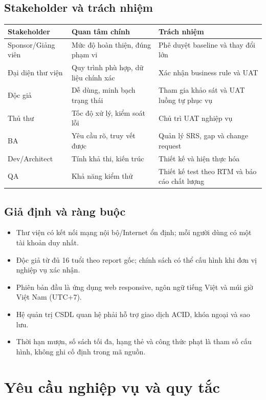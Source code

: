 \documentclass[12pt,a4paper,oneside]{report}
\begin{document}
\section{Stakeholder và trách nhiệm}
\begin{tabularx}{\textwidth}{L{3cm}L{4cm}Y}
\toprule Stakeholder & Quan tâm chính & Trách nhiệm\\\midrule
Sponsor/Giảng viên & Mức độ hoàn thiện, đúng phạm vi & Phê duyệt baseline và thay đổi lớn\\
Đại diện thư viện & Quy trình phù hợp, dữ liệu chính xác & Xác nhận business rule và UAT\\
Độc giả & Dễ dùng, minh bạch trạng thái & Tham gia khảo sát và UAT luồng tự phục vụ\\
Thủ thư & Tốc độ xử lý, kiểm soát lỗi & Chủ trì UAT nghiệp vụ\\
BA & Yêu cầu rõ, truy vết được & Quản lý SRS, gap và change request\\
Dev/Architect & Tính khả thi, kiến trúc & Thiết kế và hiện thực hóa\\
QA & Khả năng kiểm thử & Thiết kế test theo RTM và báo cáo chất lượng\\
\bottomrule
\end{tabularx}

\section{Giả định và ràng buộc}
\begin{itemize}
\item Thư viện có kết nối mạng nội bộ/Internet ổn định; mỗi người dùng có một tài khoản duy nhất.
\item Độc giả từ đủ 16 tuổi theo report gốc; chính sách có thể cấu hình khi đơn vị nghiệp vụ xác nhận.
\item Phiên bản đầu là ứng dụng web responsive, ngôn ngữ tiếng Việt và múi giờ Việt Nam (UTC+7).
\item Hệ quản trị CSDL quan hệ phải hỗ trợ giao dịch ACID, khóa ngoại và sao lưu.
\item Thời hạn mượn, số sách tối đa, hạng thẻ và công thức phạt là tham số cấu hình, không ghi cố định trong mã nguồn.
\end{itemize}

\chapter{Yêu cầu nghiệp vụ và quy tắc}
\end{document}

